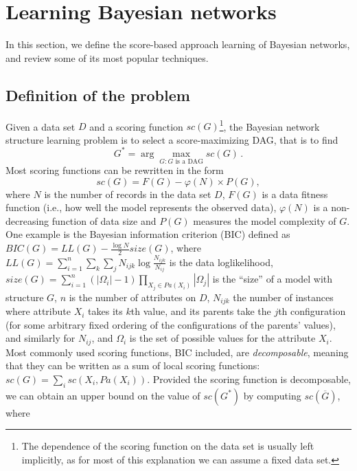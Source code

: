 \section{Learning Bayesian networks}
\label{sec:learning}

In this section, we define the score-based approach learning of Bayesian networks, and review some of its most popular techniques.

\subsection{Definition of the problem}
\label{subsec:definition}

Given a data set $D$ and a scoring function ${sc}(G)$\footnote{The dependence of the scoring function on the data set is usually left implicitly, as for most of this explanation we can assume a fixed data set.}, the Bayesian network structure learning problem is to select a score-maximizing DAG, that is to find
	\begin{equation}
		\label{eq:optimal}
		G^* = \arg\max_{G: G \text{ is a DAG}} {sc}( G ) \, .
	\end{equation}
Most scoring functions can be rewritten in the form
	\begin{equation}
		\label{eq:scoringfunction}
		{sc}( G ) = F( G ) - \varphi( N ) \times P( G ) ,
	\end{equation}
where $N$ is the number of records in the data set $D$, $F( G )$ is a data fitness function (i.e., how well the model represents the observed data), $\varphi( N )$ is a non-decreasing function of data size and $P( G )$ measures the model complexity of $G$. One example is the Bayesian information criterion (BIC) defined as ${BIC}( G ) = {LL}( G ) - \frac{\log N}{2} {size}( G )$, where ${LL}( G ) = \sum_{i=1}^{n} \sum_{k} \sum_{j} N_{ijk} \log \frac{N_{ijk}}{N_{ij}}$ is the data loglikelihood, ${size}( G ) = \sum_{i=1}^{n} ( |\Omega_i| - 1 ) \prod_{X_j \in {Pa}( X_i )} |\Omega_j|$ is the ``size'' of a model with structure $G$, $n$ is the number of attributes on $D$, $N_{ijk}$ the number of instances where attribute $X_i$ takes its $k$th value, and its parents take the $j$th configuration (for some arbitrary fixed ordering of the configurations of the parents' values), and similarly  for $N_{ij}$, and $\Omega_i$ is the set of possible values for the attribute $X_i$.
Most commonly used scoring functions, BIC included, are \emph{decomposable}, meaning that they can be written as a sum of local scoring functions: ${sc}(G)=\sum_i {sc}(X_i, {Pa}(X_i))$. Provided the scoring function is decomposable, we can obtain an upper bound on the value of $sc(G^*)$ by computing $sc(\overline{G})$, where
